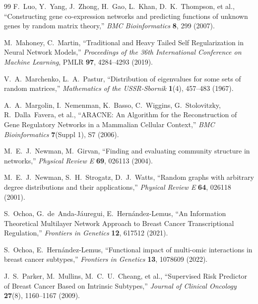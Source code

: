 \documentclass[11pt]{article}
\begin{document}
\begin{thebibliography}{99}
F.~Luo, Y.~Yang, J.~Zhong, H.~Gao, L.~Khan, D.~K.~Thompson, et al.,
\newblock ``Constructing gene co-expression networks and predicting functions of unknown genes by random matrix theory,''
\newblock \emph{BMC Bioinformatics} \textbf{8}, 299 (2007).

M.~Mahoney, C.~Martin,
\newblock ``Traditional and Heavy Tailed Self Regularization in Neural Network Models,''
\newblock \emph{Proceedings of the 36th International Conference on Machine Learning}, PMLR \textbf{97}, 4284--4293 (2019).

V.~A.~Marchenko, L.~A.~Pastur,
\newblock ``Distribution of eigenvalues for some sets of random matrices,''
\newblock \emph{Mathematics of the USSR-Sbornik} \textbf{1}(4), 457--483 (1967).

A.~A.~Margolin, I.~Nemenman, K.~Basso, C.~Wiggins, G.~Stolovitzky, R.~Dalla~Favera, et al.,
\newblock ``ARACNE: An Algorithm for the Reconstruction of Gene Regulatory Networks in a Mammalian Cellular Context,''
\newblock \emph{BMC Bioinformatics} \textbf{7}(Suppl 1), S7 (2006).

M.~E.~J.~Newman, M.~Girvan,
\newblock ``Finding and evaluating community structure in networks,''
\newblock \emph{Physical Review E} \textbf{69}, 026113 (2004).

M.~E.~J.~Newman, S.~H.~Strogatz, D.~J.~Watts,
\newblock ``Random graphs with arbitrary degree distributions and their applications,''
\newblock \emph{Physical Review E} \textbf{64}, 026118 (2001).

S.~Ochoa, G.~de~Anda-J\'auregui, E.~Hern\'andez-Lemus,
\newblock ``An Information Theoretical Multilayer Network Approach to Breast Cancer Transcriptional Regulation,''
\newblock \emph{Frontiers in Genetics} \textbf{12}, 617512 (2021).

S.~Ochoa, E.~Hern\'andez-Lemus,
\newblock ``Functional impact of multi-omic interactions in breast cancer subtypes,''
\newblock \emph{Frontiers in Genetics} \textbf{13}, 1078609 (2022).

J.~S.~Parker, M.~Mullins, M.~C.~U.~Cheang, et al.,
\newblock ``Supervised Risk Predictor of Breast Cancer Based on Intrinsic Subtypes,''
\newblock \emph{Journal of Clinical Oncology} \textbf{27}(8), 1160--1167 (2009).


\end{thebibliography}
\end{document}
